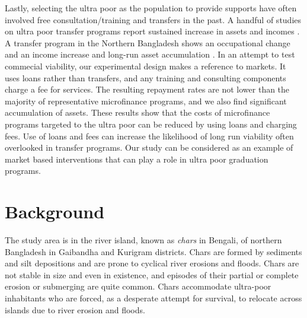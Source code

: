 	Lastly, selecting the ultra poor as the population to provide supports have often involved free consultation/training and transfers in the past. A handful of studies on ultra poor transfer programs report sustained increase in assets and incomes \citep{Blattman2014, BanerjeeetalScience2015, Blattmanetal2016, HaushoferShapiro2016}. A transfer program in the Northern Bangladesh shows an occupational change and an income increase \citep{BandieraBRAC2017} and long-run asset accumulation \citep{Balboni2020}. %
	In an attempt to test commecial viability, our experimental design makes a reference to markets. It uses loans rather than transfers, and any training and consulting components charge a fee for services. The resulting repayment rates are not lower than the majority of representative microfinance programs, and we also find significant accumulation of assets. These results show that the costs of microfinance programs targeted to the ultra poor can be reduced by using loans and charging fees. Use of loans and fees can increase the likelihood of long run viability often overlooked in transfer programs.\label{PageOfCostsMFReduced} Our study can be considered as an example of market based interventions that can play a role in ultra poor graduation programs.


\section{Background}
\label{SecBackground}


	The study area is in the river island, known as \textit{chars} in Bengali, of northern Bangladesh in Gaibandha and Kurigram districts. Chars are formed by sediments and silt depositions and are prone to cyclical river erosions and floods. Chars are not stable in size and even in existence, and episodes of their partial or complete erosion or submerging are quite common. Chars accommodate ultra-poor inhabitants who are forced, as a desperate attempt for survival, to relocate across islands due to river erosion and floods.

